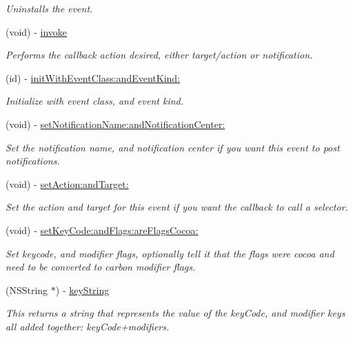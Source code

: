 \begin{DoxyCompactItemize}
\begin{DoxyCompactList}\small\item\em Uninstalls the event. \item\end{DoxyCompactList}\item 
(void) -\/ \hyperlink{interface_g_d_carbon_event_a4639c12245fe48e533ec792b3f89d90e}{invoke}
\begin{DoxyCompactList}\small\item\em Performs the callback action desired, either target/action or notification. \item\end{DoxyCompactList}\item 
(id) -\/ \hyperlink{interface_g_d_carbon_event_a8826878465bd97dd2aab07a7cef13b40}{initWithEventClass:andEventKind:}
\begin{DoxyCompactList}\small\item\em Initialize with event class, and event kind. \item\end{DoxyCompactList}\item 
(void) -\/ \hyperlink{interface_g_d_carbon_event_a33e3feb0ec56180d02e170e8bf213b6c}{setNotificationName:andNotificationCenter:}
\begin{DoxyCompactList}\small\item\em Set the notification name, and notification center if you want this event to post notifications. \item\end{DoxyCompactList}\item 
(void) -\/ \hyperlink{interface_g_d_carbon_event_af2ae15b5b721c80a99c6fd84fc5fc23e}{setAction:andTarget:}
\begin{DoxyCompactList}\small\item\em Set the action and target for this event if you want the callback to call a selector. \item\end{DoxyCompactList}\item 
(void) -\/ \hyperlink{interface_g_d_carbon_event_a0140fa16d6e2987aa2437f6e56a8269d}{setKeyCode:andFlags:areFlagsCocoa:}
\begin{DoxyCompactList}\small\item\em Set keycode, and modifier flags, optionally tell it that the flags were cocoa and need to be converted to carbon modifier flags. \item\end{DoxyCompactList}\item 
\hypertarget{interface_g_d_carbon_event_a140777cec8832d843cf2147ca31d552d}{
(NSString $\ast$) -\/ \hyperlink{interface_g_d_carbon_event_a140777cec8832d843cf2147ca31d552d}{keyString}}
\label{interface_g_d_carbon_event_a140777cec8832d843cf2147ca31d552d}

\begin{DoxyCompactList}\small\item\em This returns a string that represents the value of the keyCode, and modifier keys all added together: keyCode+modifiers. \item\end{DoxyCompactList}\end{DoxyCompactItemize}
